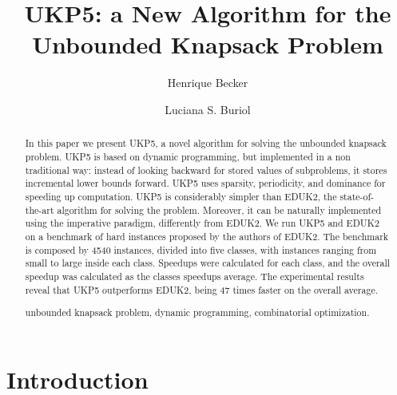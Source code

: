 \documentclass[runningheads,a4paper]{llncs}
\newcommand{\keywords}[1]{\par\addvspace\baselineskip
\noindent\keywordname\enspace\ignorespaces#1}
\begin{document}
\mainmatter  %

\title{UKP5: a New Algorithm for the Unbounded Knapsack Problem}


\author{Henrique Becker \and Luciana S. Buriol}


\maketitle

\begin{abstract}
In this paper we present UKP5, a novel algorithm for solving the unbounded knapsack problem. 
UKP5 is based on dynamic programming, but implemented in a non traditional way: instead of looking backward for stored values of subproblems, 
it stores incremental lower bounds forward. 
UKP5 uses sparsity, periodicity, and dominance for speeding up computation. 
UKP5 is considerably simpler than EDUK2, the state-of-the-art algorithm for solving the problem. 
Moreover, it can be naturally implemented using the imperative paradigm, differently from EDUK2. 
We run UKP5 and EDUK2 on a benchmark of hard instances proposed by the authors of EDUK2. 
The benchmark is composed by 4540 instances, divided into five classes, with instances ranging from small to large inside each class. 
Speedups were calculated for each class, and the overall speedup was calculated as the classes speedups average. 
The experimental results reveal that UKP5 outperforms EDUK2, being 47 times faster on the overall average.
\keywords{unbounded knapsack problem, dynamic programming, combinatorial optimization.}
\end{abstract}

\section{Introduction}
\end{document}
